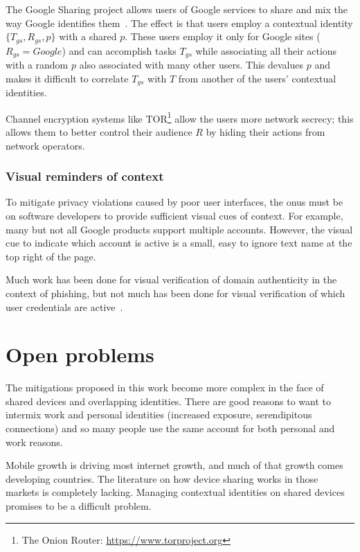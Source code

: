 \documentclass{llncs}
\begin{document}
The Google Sharing project allows users of Google services to share and mix the way Google identifies them~\cite{googlesharing}.  The effect is that users employ a contextual identity $\{T_{gs}, R_{gs}, p\}$ with a shared $p$.  These users employ it only for Google sites ($R_{gs} = Google$) and can accomplish tasks $T_{gs}$ while associating all their actions with a random $p$ also associated with many other users.  This devalues $p$ and makes it difficult to correlate $T_{gs}$ with $T$ from another of the users' contextual identities.

Channel encryption systems like TOR\footnote{The Onion Router: \url{https://www.torproject.org}} allow the users more network secrecy; this allows them to better control their audience $R$ by hiding their actions from network operators.

\subsubsection{Visual reminders of context}
To mitigate privacy violations caused by poor user interfaces, the onus must be
on software developers to provide sufficient visual cues of context. For
example, many but not all Google products support multiple accounts. However,
the visual cue to indicate which account is active is a small, easy to ignore
text name at the top right of the page.

Much work has been done for visual verification of domain authenticity in the
context of phishing, but not much has been done for visual verification of
which user credentials are active~\cite{skins}.

\begin{comment}
first party regrets, third party regrets
impossible to judge how big friends of friends
\end{comment}

\section{Open problems}
The mitigations proposed in this work become more complex in the face of shared
devices and overlapping identities. There are good reasons to want to intermix
work and personal identities (increased exposure, serendipitous connections)
and so many people use the same account for both personal and work reasons.

Mobile growth is driving most internet growth, and much of that growth comes
developing countries. The literature on how device sharing works in those
markets is completely lacking. Managing contextual identities on shared devices
promises to be a difficult problem.
\end{document}
